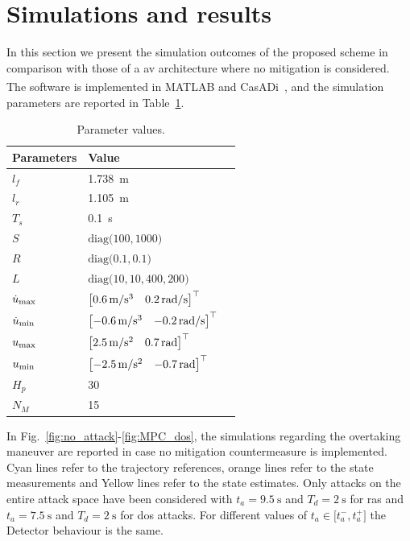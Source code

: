 \section{Simulations and results}
\label{sec:fourth}
%
In this section we present the simulation outcomes of the proposed scheme in comparison with those of a \gls{av} architecture where no mitigation is considered. The software is implemented in MATLAB\textsuperscript{\textregistered} and CasADi~\cite{Casadi}, and the simulation parameters are reported in Table~\ref{tab:parameters}.
%
\begin{table}[ht]
	\centering
	\begin{tabular}[ht]{|l|l|c|}
		\hline
		\textbf{Parameters} & \textbf{Value}\\
		\hline
		$l_f$& \SI{1.738}{\metre}\\
		$l_r$& \SI{1.105}{\metre}\\
		$T_s$& \SI{0.1}{\second}\\
		$S$&  $\mathrm{diag}\big(100,1000\big)$ \\
		$R$& $\mathrm{diag}\big(0.1,0.1\big)$\\
		$L$& $\mathrm{diag}\big(10,10,400,200\big)$ \\
		$\dot{u}_{{\rm max}}$& $\begin{bmatrix}\SI{0.6}{{\metre}/{\second^3}} & \SI{0.2}{{\radian}/{\second}}\end{bmatrix}^\top$ \\
		$\dot{u}_{{ \rm min}}$& $\begin{bmatrix}\SI{-0.6}{{\metre}/{\second^3}} & \SI{-0.2}{{\radian}/{\second}}\end{bmatrix}^\top$ \\
		${u}_{{ \rm max}}$&$\begin{bmatrix}\SI{2.5}{{\metre}/{\second^2}} & \SI{0.7}{\radian}\end{bmatrix}^\top$\\
		${u}_{{ \rm min}}$& $\begin{bmatrix}\SI{-2.5}{{\metre}/{\second^2}} & \SI{-0.7}{\radian}\end{bmatrix}^\top$ \\
		$H_p$& 30 \\
		$N_M$& 15 \\
		\hline
	\end{tabular}
	\caption{Parameter values.}
	\label{tab:parameters}
\end{table}%
%
%	 
In \mbox{Fig.~\ref{fig:no_attack}-\ref{fig:MPC_dos}}, the simulations regarding the overtaking maneuver are reported in case no mitigation countermeasure is implemented. Cyan lines refer to the trajectory references, orange lines refer to the state measurements and Yellow lines refer to the state estimates. Only attacks on the entire attack space have been considered with $t_a= \SI{9.5}{\second}$ and $T_d=\SI{2}{\second}$ for \glspl{ra} and $t_a= \SI{7.5}{\second}$ and $T_d=\SI{2}{\second}$ for \gls{dos} attacks. For different values of $t_a \in \big[t^-_a, t^+_a\big]$ the Detector behaviour is the same. 

